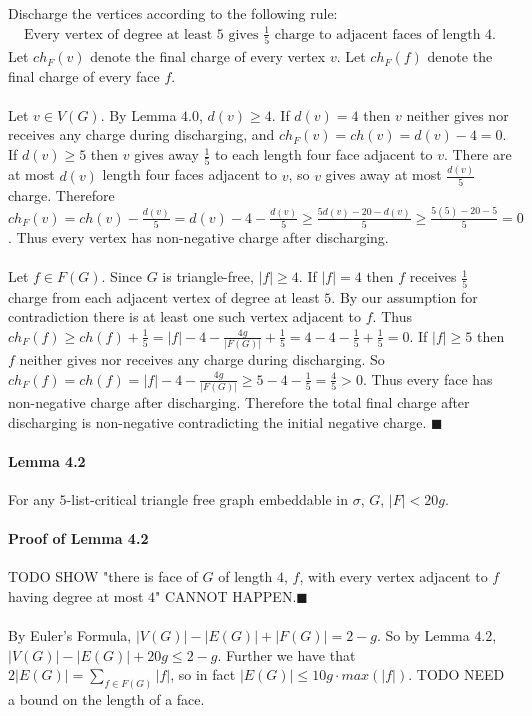 \documentclass[letterpaper,12pt,oneside,onecolumn]{report}
\begin{document}
\paragraph{}
Discharge the vertices according to the following rule:
\begin{align}
\text{Every vertex of degree at least $5$ gives $\frac{1}{5}$ charge to adjacent faces of length $4$.}
\end{align}
Let $ch_F(v)$ denote the final charge of every vertex $v$. Let $ch_F(f)$ denote the final charge of every face $f$.
\paragraph{}
Let $v \in V(G)$. By Lemma $4.0$, $d(v) \geq 4$. If $d(v) = 4$ then $v$ neither gives nor receives any charge during discharging, and $ch_F(v) = ch(v) = d(v) - 4 = 0$. If $d(v) \geq 5$ then $v$ gives away $\frac{1}{5}$ to each length four face adjacent to $v$. There are at most $d(v)$ length four faces adjacent to $v$, so $v$ gives away at most $\frac{d(v)}{5}$ charge. Therefore $ch_F(v) = ch(v) - \frac{d(v)}{5} = d(v) - 4 - \frac{d(v)}{5} \geq \frac{5d(v) - 20 - d(v)}{5} \geq \frac{5(5) - 20 -5}{5} = 0$. Thus every vertex has non-negative charge after discharging.
\paragraph{}
Let $f \in F(G)$. Since $G$ is triangle-free, $|f| \geq 4$. If $|f| = 4$ then $f$ receives $\frac{1}{5}$ charge from each adjacent vertex of degree at least $5$. By our assumption for contradiction there is at least one such vertex adjacent to $f$. Thus $ch_F(f) \geq ch(f) + \frac{1}{5} = |f| - 4 - \frac{4g}{|F(G)|} + \frac{1}{5} = 4 - 4 - \frac{1}{5} + \frac{1}{5} = 0$. If $|f| \geq 5$ then $f$ neither gives nor receives any charge during discharging. So $ch_F(f) = ch(f) = |f| - 4 -\frac{4g}{|F(G)|} \geq 5 - 4 - \frac{1}{5} = \frac{4}{5} > 0$. Thus every face has non-negative charge after discharging. Therefore the total final charge after discharging is non-negative contradicting the initial negative charge. $\blacksquare$
\paragraph{Lemma 4.2}
For any $5$-list-critical triangle free graph embeddable in $\sigma$, $G$, $|F| < 20g$.
\paragraph{Proof of Lemma 4.2}
TODO SHOW "there is face of $G$ of length $4$, $f$, with every vertex adjacent to $f$ having degree at most $4$" CANNOT HAPPEN.$\blacksquare$
\paragraph{}
By Euler's Formula, $|V(G)| - |E(G)| + |F(G)| = 2-g$. So by Lemma $4.2$, $|V(G)| - |E(G)| + 20g \leq 2-g$. Further we have that $2|E(G)| = \sum_{f \in F(G)} |f|$, so in fact $|E(G)| \leq 10g\cdot max(|f|)$. TODO NEED a bound on the length of a face. 
\end{document}
